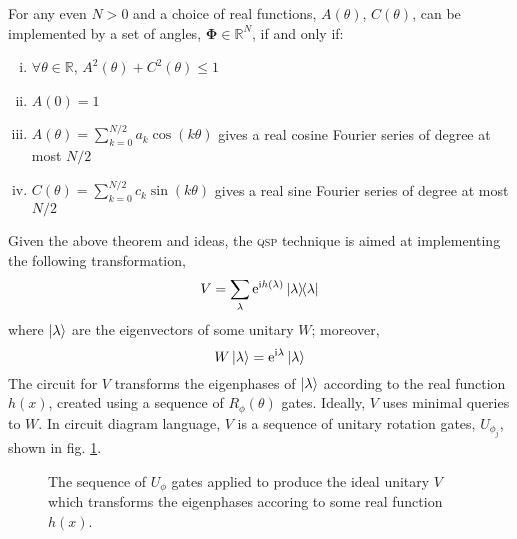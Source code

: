 \documentclass{article}
\begin{document}
\begin{thrm}{\textnormal{\cite{LC17,LC19}}}\label{thrm:1}
    
    \noindent For any even $N>0$ and a choice of real functions, $A(\theta)$, $C(\theta)$, can be implemented by a set of angles, $\boldsymbol{\Phi}\in\mathbb{R}^N$, if and only if:
    \begin{enumerate}[(i)]
        \item $\forall \theta \in \mathbb{R}$, $A^2(\theta) + C^2(\theta)\leq 1$
        \item $A(0) = 1$
        \item $A(\theta) =\displaystyle\sum_{k=0}^{N/2} a_k \cos(k \theta)$ gives a real cosine Fourier series of degree at most $N/2$
        \item $C(\theta) =\displaystyle\sum_{k=0}^{N/2} c_k \sin(k \theta)$ gives a real sine Fourier series of degree at most $N/2$
    \end{enumerate}
\end{thrm}

Given the above theorem and ideas, the \textsc{qsp} technique is aimed at implementing the following transformation,
\begin{equation}\label{eq:v_ideal}
    V = \sum_\lambda \mathrm{e}^{\mathrm{i} h(\lambda)}\ketbra{\lambda}
\end{equation}
where $\ket{\lambda}$ are the eigenvectors of some unitary $W$; moreover,
\begin{equation}
    W\ket{\lambda} = \mathrm{e}^{\mathrm{i} \lambda}\ket{\lambda}
\end{equation}
The circuit for $V$ transforms the eigenphases of $\ket{\lambda}$ according to the real function $h(x)$, created using a sequence of $R_\phi(\theta)$ gates. Ideally, $V$ uses minimal queries to $W$. In circuit diagram language, $V$ is a sequence of unitary rotation gates, $U_{\phi_j}$, shown in fig. \ref{fig:v_ideal}. 

\begin{figure}[h!]
    \centering
    \caption{The sequence of $U_{\phi}$ gates applied to produce the ideal unitary $V$ which transforms the eigenphases accoring to some real function $h(x)$.}
    \label{fig:v_ideal}
\end{figure}
\end{document}
